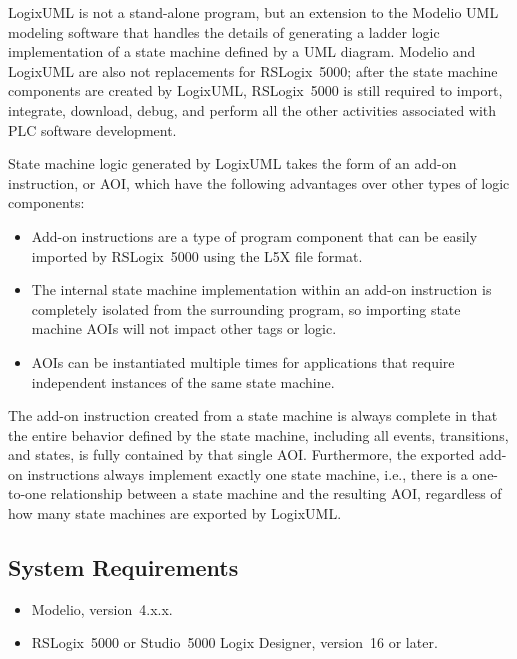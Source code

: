 LogixUML is not a stand-alone program, but an extension to the Modelio
UML modeling software that handles the details of generating a ladder
logic implementation of a state machine defined by a UML diagram.
Modelio and LogixUML are also not replacements for RSLogix~5000;
after the state machine components are created by LogixUML, RSLogix~5000
is still required to import, integrate, download, debug, and perform all
the other activities associated with PLC software development.

State machine logic generated by LogixUML takes the form of an add-on
instruction, or AOI, which have the following advantages over other
types of logic components:

\begin{itemize}
  \item Add-on instructions are a type of program component that can be
    easily imported by RSLogix~5000 using the L5X file format.

  \item The internal state machine implementation within an add-on
    instruction is completely isolated from the surrounding program,
    so importing state machine AOIs will not impact other tags or logic.

  \item AOIs can be instantiated multiple times for applications that require
    independent instances of the same state machine.
\end{itemize}

The add-on instruction created from a state machine is always complete
in that the entire behavior defined by the state machine,
including all events, transitions, and states, is fully contained by that
single AOI. Furthermore, the exported add-on instructions always implement
exactly one state machine, i.e., there is a one-to-one relationship between a
state machine and the resulting AOI, regardless of how many state machines
are exported by LogixUML.


\subsection{System Requirements}

\begin{itemize}
  \item Modelio, version~4.x.x.

  \item RSLogix~5000 or Studio~5000 Logix Designer, version~16 or later.
\end{itemize}


